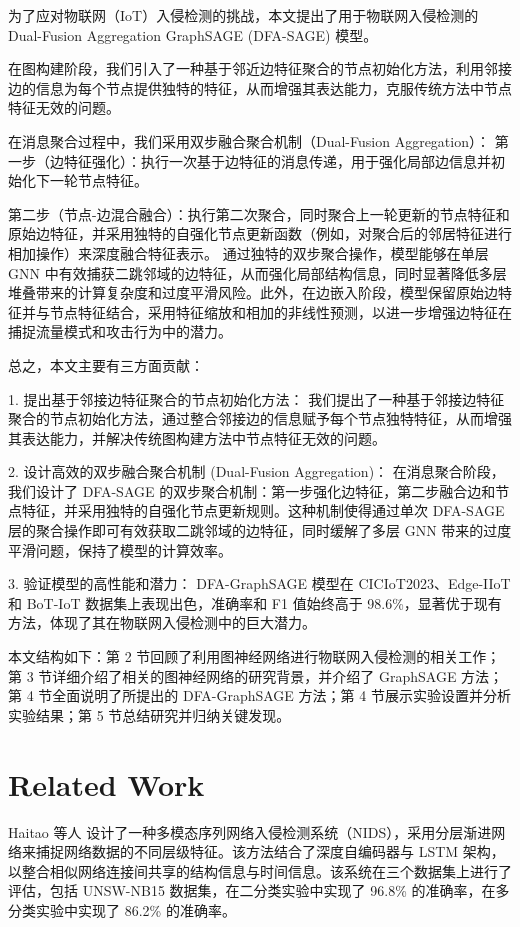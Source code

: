 \documentclass{article}
\begin{document}
为了应对物联网（IoT）入侵检测的挑战，本文提出了用于物联网入侵检测的 Dual-Fusion Aggregation GraphSAGE (DFA-SAGE) 模型。

在图构建阶段，我们引入了一种基于邻近边特征聚合的节点初始化方法，利用邻接边的信息为每个节点提供独特的特征，从而增强其表达能力，克服传统方法中节点特征无效的问题。

在消息聚合过程中，我们采用双步融合聚合机制（Dual-Fusion Aggregation）：
第一步（边特征强化）：执行一次基于边特征的消息传递，用于强化局部边信息并初始化下一轮节点特征。

第二步（节点-边混合融合）：执行第二次聚合，同时聚合上一轮更新的节点特征和原始边特征，并采用独特的自强化节点更新函数（例如，对聚合后的邻居特征进行相加操作）来深度融合特征表示。
通过独特的双步聚合操作，模型能够在单层 GNN 中有效捕获二跳邻域的边特征，从而强化局部结构信息，同时显著降低多层堆叠带来的计算复杂度和过度平滑风险。此外，在边嵌入阶段，模型保留原始边特征并与节点特征结合，采用特征缩放和相加的非线性预测，以进一步增强边特征在捕捉流量模式和攻击行为中的潜力。

总之，本文主要有三方面贡献：

1. 提出基于邻接边特征聚合的节点初始化方法： 我们提出了一种基于邻接边特征聚合的节点初始化方法，通过整合邻接边的信息赋予每个节点独特特征，从而增强其表达能力，并解决传统图构建方法中节点特征无效的问题。

2. 设计高效的双步融合聚合机制 (Dual-Fusion Aggregation)： 在消息聚合阶段，我们设计了 DFA-SAGE 的双步聚合机制：第一步强化边特征，第二步融合边和节点特征，并采用独特的自强化节点更新规则。这种机制使得通过单次 DFA-SAGE 层的聚合操作即可有效获取二跳邻域的边特征，同时缓解了多层 GNN 带来的过度平滑问题，保持了模型的计算效率。

3. 验证模型的高性能和潜力： DFA-GraphSAGE 模型在 CICIoT2023、Edge-IIoT 和 BoT-IoT 数据集上表现出色，准确率和 F1 值始终高于 98.6\%，显著优于现有方法，体现了其在物联网入侵检测中的巨大潜力。

本文结构如下：第 2 节回顾了利用图神经网络进行物联网入侵检测的相关工作；第 3 节详细介绍了相关的图神经网络的研究背景，并介绍了 GraphSAGE 方法；第 4 节全面说明了所提出的 DFA-GraphSAGE 方法；第 4 节展示实验设置并分析实验结果；第 5 节总结研究并归纳关键发现。



\section{Related Work}

Haitao 等人 \cite{He2019} 设计了一种多模态序列网络入侵检测系统（NIDS），采用分层渐进网络来捕捉网络数据的不同层级特征。该方法结合了深度自编码器与 LSTM 架构，以整合相似网络连接间共享的结构信息与时间信息。该系统在三个数据集上进行了评估，包括 UNSW-NB15 数据集，在二分类实验中实现了 96.8\% 的准确率，在多分类实验中实现了 86.2\% 的准确率。
\end{document}
